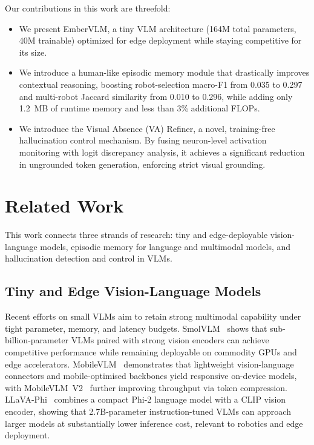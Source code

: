 \documentclass[runningheads]{llncs}
\begin{document}
Our contributions in this work are threefold:
\begin{itemize}
    \item We present EmberVLM, a tiny VLM architecture (164M total parameters, 40M trainable) optimized for edge deployment while staying competitive for its size. 
    \item We introduce a human-like episodic memory module that drastically improves contextual reasoning, boosting robot-selection macro-F1 from 0.035 to 0.297 and multi-robot Jaccard similarity from 0.010 to 0.296, while adding only 1.2~MB of runtime memory and less than 3\% additional FLOPs.
    \item We introduce the Visual Absence (VA) Refiner, a novel, training-free hallucination control mechanism. By fusing neuron-level activation monitoring with logit discrepancy analysis, it achieves a significant reduction in ungrounded token generation, enforcing strict visual grounding.
\end{itemize}

\section{Related Work}

This work connects three strands of research: tiny and edge-deployable
vision-language models, episodic memory for language and multimodal models,
and hallucination detection and
control in VLMs.

\subsection{Tiny and Edge Vision-Language Models}

Recent efforts on small VLMs aim to retain strong multimodal capability
under tight parameter, memory, and latency budgets.
SmolVLM~\cite{smolvlm2024} shows that sub-billion-parameter VLMs paired
with strong vision encoders can achieve competitive performance while
remaining deployable on commodity GPUs and edge accelerators.
MobileVLM~\cite{chu2023mobilevlm} demonstrates that lightweight
vision-language connectors and mobile-optimised backbones yield
responsive on-device models, with MobileVLM~V2~\cite{chu2024mobilevlmv2}
further improving throughput via token compression.
LLaVA-Phi~\cite{zhu2024llavaphi} combines a compact Phi-2 language model
with a CLIP vision encoder, showing that 2.7B-parameter instruction-tuned
VLMs can approach larger models at substantially lower inference cost,
relevant to robotics and edge deployment.
\end{document}

